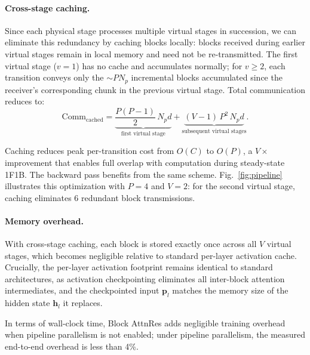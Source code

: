 \paragraph{Cross-stage caching.}
Since each physical stage processes multiple virtual stages in succession, we can eliminate this redundancy by caching blocks locally: blocks received during earlier virtual stages remain in local memory and need not be re-transmitted.
The first virtual stage ($v = 1$) has no cache and accumulates normally; for $v \geq 2$, each transition conveys only the ${\sim}P N_p$ incremental blocks accumulated since the receiver's corresponding chunk in the previous virtual stage.
Total communication reduces to:
\begin{equation}
    \mathrm{Comm}_{\text{cached}} = \underbrace{\frac{P(P{-}1)}{2}\, N_p d}_{\text{first virtual stage}} + \underbrace{(V{-}1)\, P^2\, N_p d}_{\text{subsequent virtual stages}}.
\end{equation}



Caching reduces peak per-transition cost from $O(C)$ to $O(P)$, a $V{\times}$ improvement that enables full overlap with computation during steady-state 1F1B.
The backward pass benefits from the same scheme. Fig.~\ref{fig:pipeline} illustrates this optimization with $P{=}4$ and $V{=}2$: for the second virtual stage, caching eliminates 6 redundant block transmissions.

\paragraph{Memory overhead.}
With cross-stage caching, each block is stored exactly once across all $V$ virtual stages, which becomes negligible relative to standard per-layer activation cache. Crucially, the per-layer activation footprint remains identical to standard architectures, as activation checkpointing eliminates all inter-block attention intermediates, and the checkpointed input $\bm{p}_l$ matches the memory size of the hidden state $\bm{h}_l$ it replaces.

In terms of wall-clock time, Block AttnRes adds negligible training overhead when pipeline parallelism is not enabled; under pipeline parallelism, the measured end-to-end overhead is less than 4\%.





















